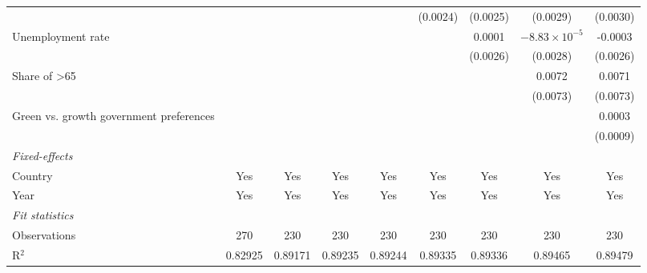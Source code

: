 \begin{table}[htbp]
\begin{tabular}{lcccccccc}
                                                                      &          &                &                &               & (0.0024) & (0.0025) & (0.0029)               & (0.0030)\\   
      Unemployment rate                                               &          &                &                &               &          & 0.0001   & $-8.83\times 10^{-5}$  & -0.0003\\   
                                                                      &          &                &                &               &          & (0.0026) & (0.0028)               & (0.0026)\\   
      Share of >65                                                    &          &                &                &               &          &          & 0.0072                 & 0.0071\\   
                                                                      &          &                &                &               &          &          & (0.0073)               & (0.0073)\\   
      Green vs. growth government preferences                         &          &                &                &               &          &          &                        & 0.0003\\   
                                                                      &          &                &                &               &          &          &                        & (0.0009)\\   
      \midrule
      \emph{Fixed-effects}\\
      Country                                                         & Yes      & Yes            & Yes            & Yes           & Yes      & Yes      & Yes                    & Yes\\  
      Year                                                            & Yes      & Yes            & Yes            & Yes           & Yes      & Yes      & Yes                    & Yes\\  
      \midrule
      \emph{Fit statistics}\\
      Observations                                                    & 270      & 230            & 230            & 230           & 230      & 230      & 230                    & 230\\  
      R$^2$                                                           & 0.82925  & 0.89171        & 0.89235        & 0.89244       & 0.89335  & 0.89336  & 0.89465                & 0.89479\\  

\end{tabular}
\end{table}
